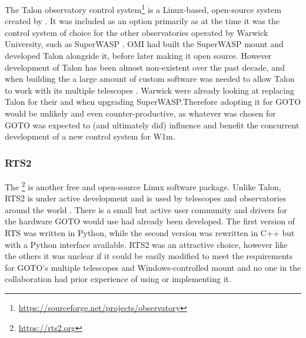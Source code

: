 \begin{colsection}
The Talon observatory control system\footnote{\url{https://sourceforge.net/projects/observatory}} is a Linux-based, open-source system created by . It was included as an option primarily as at the time it was the control system of choice for the other observatories operated by Warwick University, such as SuperWASP \citep{SuperWASP}. OMI had built the SuperWASP mount and developed Talon alongside it, before later making it open source. However development of Talon has been almost non-existent over the past decade, and when building the  a large amount of custom software was needed to allow Talon to work with its multiple telescopes \citep{ngts}. Warwick were already looking at replacing Talon for their  and when upgrading SuperWASP.\@ Therefore adopting it for GOTO would be unlikely and even counter-productive, as whatever was chosen for GOTO was expected to (and ultimately did) influence and benefit the concurrent development of a new control system for W1m.

\subsubsection{RTS2}

The \footnote{\url{https://rts2.org}} \citep{RTS2, RTS2b} is another free and open-source Linux software package. Unlike Talon, RTS2 is under active development and is used by telescopes and observatories around the world \citep{BORAT, BOOTES-3, antarctic, ARTN}. There is a small but active user community and drivers for the hardware GOTO would use had already been developed. The first version of RTS was written in Python, while the second version was rewritten in C++ but with a Python interface available. RTS2 was an attractive choice, however like the others it was unclear if it could be easily modified to meet the requirements for GOTO's multiple telescopes and Windows-controlled mount and no one in the collaboration had prior experience of using or implementing it.

\end{colsection}


